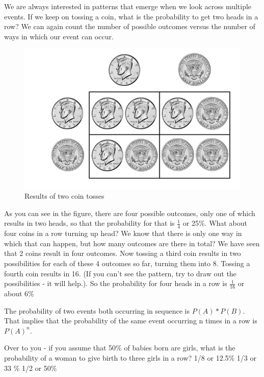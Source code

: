 \documentclass[
]{book}
\begin{document}
We are always interested in patterns that emerge when we look across multiple events. If we keep on tossing a coin, what is the probability to get two heads in a row? We can again count the number of possible outcomes versus the number of ways in which our event can occur.

\begin{figure}

{\centering \includegraphics[width=1\linewidth]{./images/coins} 

}

\caption{Results of two coin tosses}\label{fig:img-coins}
\end{figure}

As you can see in the figure, there are four possible outcomes, only one of which results in two heads, so that the probability for that is \(\frac{1}{4}\) or 25\%. What about four coins in a row turning up head? We know that there is only one way in which that can happen, but how many outcomes are there in total? We have seen that 2 coins result in four outcomes. Now tossing a third coin results in two possibilities for each of these 4 outcomes so far, turning them into 8. Tossing a fourth coin results in 16. (If you can't see the pattern, try to draw out the possibilities - it will help.). So the probability for four heads in a row is \(\frac{1}{16}\) or about 6\%

The probability of two events both occurring in sequence is \(P(A)*P(B)\). That implies that the probability of the same event occurring n times in a row is \(P(A)^n\).

Over to you - if you assume that 50\% of babies born are girls, what is the probability of a woman to give birth to three girls in a row? 1/8 or 12.5\% 1/3 or 33 \% 1/2 or 50\%
\end{document}
